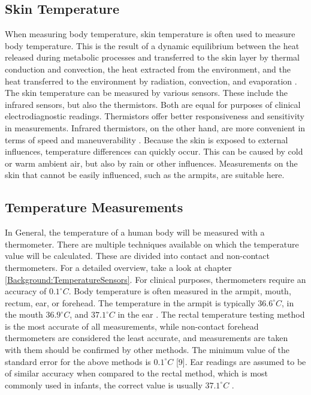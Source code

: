 \subsection{Skin Temperature}
When measuring body temperature, skin temperature is often used to measure body temperature.
This is the result of a dynamic equilibrium between the heat released during metabolic processes and transferred to the skin layer by thermal conduction and convection, the heat extracted from the environment, and the heat transferred to the environment by radiation, convection, and evaporation \cite{dolibogComparativeAnalysisHuman2022}.
The skin temperature can be measured by various sensors. 
These include the infrared sensors, but also the thermistors. 
Both are equal for purposes of clinical electrodiagnostic readings.
Thermistors offer better responsiveness and sensitivity in measurements.
Infrared thermistors, on the other hand, are more convenient in terms of speed and maneuverability \cite{burnhamThreeTypesSkinSurface2006}.
Because the skin is exposed to external influences, temperature differences can quickly occur.
This can be caused by cold or warm ambient air, but also by rain or other influences.
Measurements on the skin that cannot be easily influenced, such as the armpits, are suitable here.

\subsection{Temperature Measurements}
In General, the temperature of a human body will be measured with a thermometer.
There are multiple techniques available on which the temperature value will be calculated. 
These are divided into contact and non-contact thermometers.
For a detailed overview, take a look at chapter \ref{Background:TemperatureSensors}.
For clinical purposes, thermometers require an accuracy of $0.1^\circ C$.
Body temperature is often measured in the armpit, mouth, rectum, ear, or forehead.
The temperature in the armpit is typically $36.6^\circ C$, in the mouth $36.9^\circ C$, and $37.1^\circ C$ in the ear \cite{dolibogComparativeAnalysisHuman2022}.
The rectal temperature testing method is the most accurate of all measurements, while non-contact forehead thermometers are considered the least accurate, and measurements are taken with them should be confirmed by other methods.
The minimum value of the standard error for the above methods is $0.1^\circ C$ [9].
Ear readings are assumed to be of similar accuracy when compared to the rectal method, which is most commonly used in infants, the correct value is usually $37.1^\circ C$ \cite{dolibogComparativeAnalysisHuman2022}.

